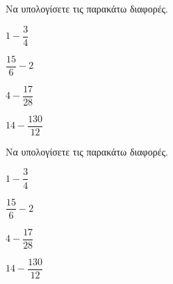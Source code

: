 Να υπολογίσετε τις παρακάτω διαφορές.
\begin{multicols}{2}
\begin{rlist}
\item $ 1-\dfrac{3}{4} $
\item $ \dfrac{15}{6}-2 $
\item $ 4-\dfrac{17}{28} $
\item $ 14-\dfrac{130}{12} $
\end{rlist}
\end{multicols}
Να υπολογίσετε τις παρακάτω διαφορές.
\begin{multicols}{2}
\begin{rlist}
\item $ 1-\dfrac{3}{4} $
\item $ \dfrac{15}{6}-2 $
\item $ 4-\dfrac{17}{28} $
\item $ 14-\dfrac{130}{12} $
\end{rlist}
\end{multicols}
